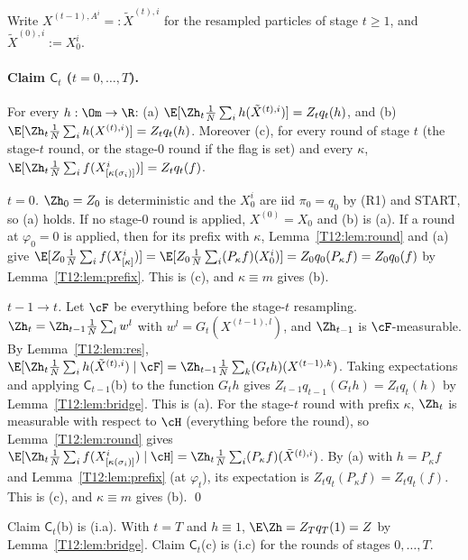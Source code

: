 \documentclass[11pt]{report}
\begin{document}
Write $X^{(t-1),A^i}=:\tilde X^{(t),i}$ for the resampled particles of stage $t\ge1$, and $\tilde X^{(0),i}:=X_0^i$.

\paragraph{Claim $\mathsf C_t$ ($t=0,\dots,T$).} For every $h:\Om\to\R$: (a) $\E[\Zh_t\frac1N\sum_ih(\tilde X^{(t),i})]=Z_tq_t(h)$, and (b) $\E[\Zh_t\frac1N\sum_ih(X^{(t),i})]=Z_tq_t(h)$. Moreover (c), for every round of stage $t$ (the stage-$t$ round, or the stage-0 round if the flag is set) and every $\kappa$, $\E[\Zh_t\frac1N\sum_i f(X^i_{[\kappa(\sigma_i)]})]=Z_tq_t(f)$.

\emph{$t=0$.} $\Zh_0=Z_0$ is deterministic and the $X_0^i$ are iid $\pi_0=q_0$ by (R1) and START, so (a) holds. If no stage-0 round is applied, $X^{(0)}=X_0$ and (b) is (a). If a round at $\varphi_0=0$ is applied, then for its prefix with $\kappa$, Lemma~\ref{T12:lem:round} and (a) give $\E[Z_0\frac1N\sum_if(X^i_{[\kappa]})]=\E[Z_0\frac1N\sum_i(P_\kappa f)(X_0^i)]=Z_0q_0(P_\kappa f)=Z_0q_0(f)$ by Lemma~\ref{T12:lem:prefix}. This is (c), and $\kappa\equiv m$ gives (b).

\emph{$t-1\to t$.} Let $\cF$ be everything before the stage-$t$ resampling. $\Zh_t=\Zh_{t-1}\frac1N\sum_lw^l$ with $w^l=G_t(X^{(t-1),l})$, and $\Zh_{t-1}$ is $\cF$-measurable. By Lemma~\ref{T12:lem:res},
$\E[\Zh_t\frac1N\sum_ih(\tilde X^{(t),i})\mid\cF]=\Zh_{t-1}\frac1N\sum_k(G_th)(X^{(t-1),k})$.
Taking expectations and applying $\mathsf C_{t-1}$(b) to the function $G_th$ gives $Z_{t-1}q_{t-1}(G_th)=Z_tq_t(h)$ by Lemma~\ref{T12:lem:bridge}. This is (a). For the stage-$t$ round with prefix $\kappa$, $\Zh_t$ is measurable with respect to $\cH$ (everything before the round), so Lemma~\ref{T12:lem:round} gives
$\E[\Zh_t\frac1N\sum_if(X^i_{[\kappa(\sigma_i)]})\mid\cH]=\Zh_t\frac1N\sum_i(P_\kappa f)(\tilde X^{(t),i})$.
By (a) with $h=P_\kappa f$ and Lemma~\ref{T12:lem:prefix} (at $\varphi_t$), its expectation is $Z_tq_t(P_\kappa f)=Z_tq_t(f)$. This is (c), and $\kappa\equiv m$ gives (b). \qed

Claim $\mathsf C_t$(b) is (i.a). With $t=T$ and $h\equiv1$, $\E\Zh=Z_Tq_T(1)=Z$ by Lemma~\ref{T12:lem:bridge}. Claim $\mathsf C_t$(c) is (i.c) for the rounds of stages $0,\dots,T$.
\end{document}
